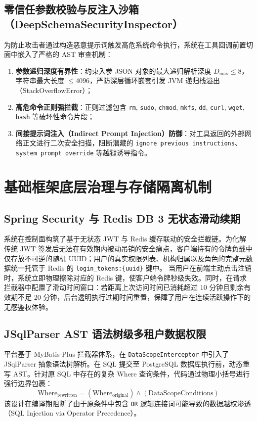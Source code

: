 \subsection{零信任参数校验与反注入沙箱（DeepSchemaSecurityInspector）}
为防止攻击者通过构造恶意提示词触发高危系统命令执行，系统在工具回调前置切面中嵌入了严格的 AST 审查机制：
\begin{enumerate}
    \item \textbf{参数递归深度有界性}：约束入参 JSON 对象的最大递归解析深度 $D_{\max} \le 8$，字符串最大长度 $\le 4096$，严防深层循环嵌套引发 JVM 递归栈溢出（StackOverflowError）；
    \item \textbf{高危命令正则强拦截}：正则过滤包含 \texttt{rm}, \texttt{sudo}, \texttt{chmod}, \texttt{mkfs}, \texttt{dd}, \texttt{curl}, \texttt{wget}, \texttt{bash} 等破坏性命令片段；
    \item \textbf{间接提示词注入（Indirect Prompt Injection）防御}：对工具返回的外部网络正文进行二次安全扫描，阻断潜藏的 \texttt{ignore previous instructions}、\texttt{system prompt override} 等越狱诱导指令。
\end{enumerate}

\section{基础框架底层治理与存储隔离机制}

\subsection{Spring Security 与 Redis DB 3 无状态滑动续期}
系统在控制面构筑了基于无状态 JWT 与 Redis 缓存联动的安全拦截链。为化解传统 JWT 签发后无法在有效期内被动吊销的安全痛点，客户端持有的令牌负载中仅存放不可逆的随机 UUID；用户的真实权限列表、机构归属以及角色的完整元数据统一托管于 Redis 的 \texttt{login\_tokens:\{uuid\}} 键中。
当用户在前端主动点击注销时，系统立即物理擦除对应的 Redis 键，使客户端令牌秒级失效。同时，在请求拦截器中配置了滑动时间窗口：若距离上次访问时间已消耗超过 10 分钟且剩余有效期不足 20 分钟，后台透明执行过期时间重置，保障了用户在连续活跃操作下的无感鉴权体验。

\subsection{JSqlParser AST 语法树级多租户数据权限}
平台基于 MyBatis-Plus 拦截器体系，在 \texttt{DataScopeInterceptor} 中引入了 JSqlParser 抽象语法树解析。在 SQL 提交至 PostgreSQL 数据库执行前，动态重写 AST。针对原 SQL 中存在的复杂 Where 查询条件，代码通过物理小括号进行强行边界包裹：
\begin{equation}
    \text{Where}_{\text{rewritten}} = (\text{Where}_{\text{original}}) \land (\text{DataScopeConditions})
\end{equation}
该设计在编译期阻断了由于原条件中包含 \texttt{OR} 逻辑连接词可能导致的数据越权渗透（SQL Injection via Operator Precedence）。

